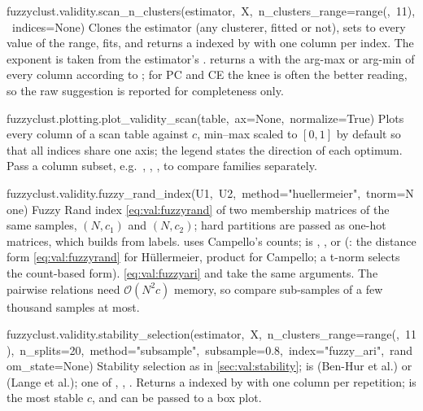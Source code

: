 \begin{apibox}{fuzzyclust.validity.scan\_n\_clusters(\allowbreak estimator,\allowbreak\ X,\allowbreak\ n\_clusters\_range=range(,\allowbreak\ 11),\allowbreak\ indices=None)}
Clones the estimator (any  clusterer, fitted or not), sets  to every value of the range, fits, and returns a  indexed by  with one column per index. The exponent is taken from the estimator's .  returns a  with the arg-max or arg-min of every column according to ; for PC and CE the knee is often the better reading, so the raw suggestion is reported for completeness only.
\end{apibox}

\begin{apibox}{fuzzyclust.plotting.plot\_validity\_scan(\allowbreak table,\allowbreak\ ax=None,\allowbreak\ normalize=True)}
Plots every column of a scan table against $c$, min--max scaled to $[0,1]$ by default so that all indices share one axis; the legend states the direction of each optimum. Pass a column subset, e.g.\ \code{table[["XB"}, , \code{"SIL"]]}, to compare families separately.
\end{apibox}

\begin{apibox}{fuzzyclust.validity.fuzzy\_rand\_index(\allowbreak U1,\allowbreak\ U2,\allowbreak\ method="huellermeier",\allowbreak\ tnorm=None)}
Fuzzy Rand index \eqref{eq:val:fuzzyrand} of two membership matrices of the same samples, $(N,c_1)$ and $(N,c_2)$; hard partitions are passed as one-hot matrices, which  builds from labels.  uses Campello's counts;  is , , or  (: the distance form \eqref{eq:val:fuzzyrand} for Hüllermeier, product for Campello; a t-norm selects the count-based form).  \eqref{eq:val:fuzzyari} and  take the same arguments. The pairwise relations need $\mathcal{O}(N^2c)$ memory, so compare sub-samples of a few thousand samples at most.
\end{apibox}

\begin{apibox}{fuzzyclust.validity.stability\_selection(\allowbreak estimator,\allowbreak\ X,\allowbreak\ n\_clusters\_range=range(,\allowbreak\ 11),\allowbreak\ n\_splits=20,\allowbreak\ method="subsample",\allowbreak\ subsample=0.8,\allowbreak\ index="fuzzy\_ari",\allowbreak\ random\_state=None)}
Stability selection as in \cref{sec:val:stability};  is  (Ben-Hur et al.) or  (Lange et al.);  one of , , . Returns a  indexed by  with one column per repetition;  is the most stable $c$, and  can be passed to a box plot.
\end{apibox}

